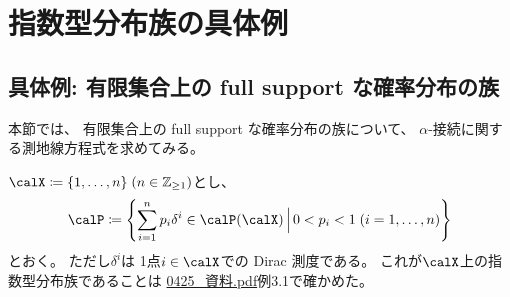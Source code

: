 \documentclass[report]{jlreq}
\begin{document}
%
\section{指数型分布族の具体例}

%
\subsection{具体例: 有限集合上の full support な確率分布の族}

本節では、
有限集合上の full support な確率分布の族について、
$\alpha$-接続に関する測地線方程式を求めてみる。

\begin{settings}
    $\calX \coloneqq \{ 1, \dots, n \} \; (n \in \Z_{\ge 1})$とし、
    \begin{equation}
        \calP \coloneqq \mybrace{
            \sum_{i = 1}^n p_i \delta^i
            \in \calP(\calX)
            \, \Big| \,
            0 < p_i < 1 \; (i = 1, \dots, n)
        }
    \end{equation}
    とおく。
    ただし$\delta^i$は
    1点$i \in \calX$での Dirac 測度である。
    これが$\calX$上の指数型分布族であることは
    \url{0425_資料.pdf}例3.1で確かめた。
\end{settings}
\end{document}
